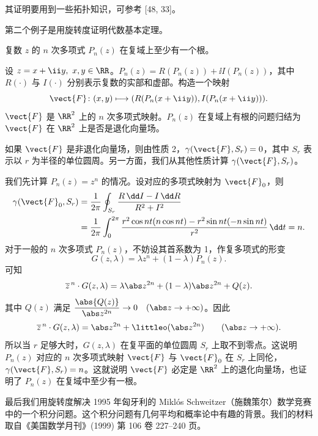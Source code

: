 其证明要用到一些拓扑知识，可参考 [48, 33]。

第二个例子是用旋转度证明代数基本定理。

\begin{xexample}[24.4.2（代数基本定理）]
复数 $z$ 的 $n$ 次多项式 $P_n(z)$ 在复域上至少有一个根。
\end{xexample}
\begin{xproof}
设 $z=x+\ii y,\ x,y\in\RR$。$P_n(z)=R(P_n(z))+\ii I(P_n(z))$，其中 $R(\cdot)$ 与 $I(\cdot)$ 分别表示复数的实部和虚部。构造一个映射
\[
  \vect{F}\colon(x,y)\longmapsto(R(P_n(x+\ii y)),I(P_n(x+\ii y))).
\]
$\vect{F}$ 是 $\RR^2$ 上的 $n$ 次多项式映射。$P_n(z)$ 在复域上有根的问题归结为 $\vect{F}$ 在 $\RR^2$ 上是否是退化向量场。

如果 $\vect{F}$ 是非退化向量场，则由性质 2，$\gamma(\vect{F},S_r)=0$，其中 $S_r$ 表示以 $r$ 为半径的单位圆周。另一方面，我们从其他性质计算 $\gamma(\vect{F},S_r)$。

我们先计算 $P_n(z)=z^n$ 的情况。设对应的多项式映射为 $\vect{F}_0$，则
\begin{align*}
  \gamma(\vect{F}_0,S_r)
  &=\frac1{2\pi}\oint_{S_r}\frac{R\,\dd I-I\,\dd R}{R^2+I^2}\\
  &=\frac1{2\pi}\int_0^{2\pi}\frac{r^2\cos nt(n\cos nt)-r^2\sin nt(-n\sin nt)}{r^2}\,\dd t=n.
\end{align*}
对于一般的 $n$ 次多项式 $P_n(z)$，不妨设其首系数为 1，作复多项式的形变
\[
  G(z,\lambda)=\lambda z^n+(1-\lambda)P_n(z).
\]
可知
\[
  \overline z^{\,n}\cdot G(z,\lambda)=\lambda\abs z^{2n}+(1-\lambda)\abs z^{2n}+Q(z).
\]
其中 $Q(z)$ 满足 $\dfrac{\abs{Q(z)}}{\abs z^{2n}}\to0\quad(\abs z\to+\infty)$。因此
\[
  \overline z^{\,n}\cdot G(z,\lambda)=\abs z^{2n}+\littleo(\abs z^{2n})\qquad(\abs z\to+\infty).
\]
所以当 $r$ 足够大时，$G(z,\lambda)$ 在复平面的单位圆周 $S_r$ 上取不到零点。这说明 $P_n(z)$ 对应的 $n$ 次多项式映射 $\vect{F}$ 与 $\vect{F}_0$ 在 $S_r$ 上同伦，$\gamma(\vect{F},S_r)=n$。这就说明 $\vect{F}$ 必定是 $\RR^2$ 上的退化向量场，也证明了 $P_n(z)$ 在复域中至少有一根。
\end{xproof}

最后我们用旋转度解决 1995 年匈牙利的 Miklós Schweitzer（施魏策尔）数学竞赛中的一个积分问题。这个积分问题有几何平均和概率论中有趣的背景。我们的材料取自《美国数学月刊》(1999) 第 106 卷 227--240 页。

